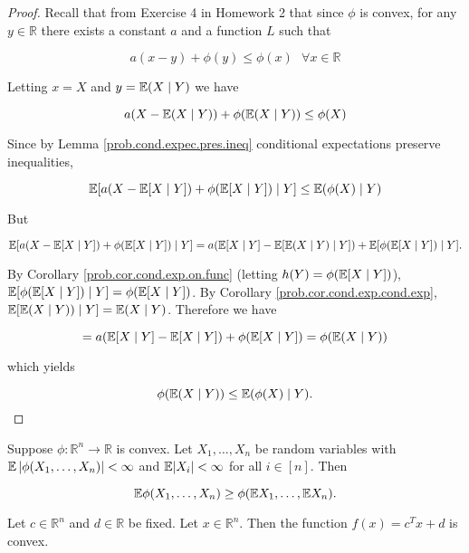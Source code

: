 \begin{proof} 


Recall that from Exercise 4 in Homework 2 that since \(\phi\) is convex, for any \(y \in \mathbb{R}\) there exists a constant \(a\) and a function \(L\) such that

\[
a(x-y)+\phi(y) \leq \phi(x) \ \ \ \forall x \in \mathbb{R}
\]

Letting \(x = X\) and \(y = \mathbb{E}(X \mid Y)\) we have

\[
a (X-\mathbb{E} (X \mid Y))+\phi(\mathbb{E} ( X \mid Y)) \leq \phi(X)
\]


Since by Lemma \ref{prob.cond.expec.pres.ineq} conditional expectations preserve inequalities,

\[
\mathbb{E}[a (X-\mathbb{E} [X \mid Y])+\phi(\mathbb{E} [X \mid Y]) \mid Y ] \leq \mathbb{E} ( \phi(X) \mid Y)
\]

But

\[
\mathbb{E}[a (X-\mathbb{E} [X \mid Y])+\phi(\mathbb{E} [X \mid Y]) \mid Y ]  = a(\mathbb{E} [X \mid Y] -  \mathbb{E}[ \mathbb{E} (X \mid Y) \mid Y] ) + \mathbb{E}[\phi(\mathbb{E} [X \mid Y]) \mid Y].
\]

By Corollary \ref{prob.cor.cond.exp.on.func} (letting \(h(Y) = \phi(\mathbb{E} [X \mid Y])\)), \( \mathbb{E}[\phi(\mathbb{E} [X \mid Y]) \mid Y] = \phi(\mathbb{E} [X \mid Y])\). By Corollary \ref{prob.cor.cond.exp.cond.exp}, \( \mathbb{E}[ \mathbb{E} (X \mid Y)) \mid Y] = \mathbb{E}(X \mid Y)\). Therefore we have

\[
 = a(\mathbb{E} [X \mid Y] - \mathbb{E} [X \mid Y]) + \phi(\mathbb{E} [X \mid Y]) = \phi(\mathbb{E} (X \mid Y))
\]

which yields

\[
\phi( \mathbb{E} (X \mid Y)) \leq \mathbb{E}( \phi(X) \mid Y).
\]


\end{proof}

\begin{theorem}\label{cvx.multi.jensen}

Suppose \(\phi: \mathbb{R}^n \to \mathbb{R}\) is convex. Let \(X_1, \ldots, X_n\) be random variables with \(\mathbb{E}\left| \phi(X_1, \ldots, X_n)\right| < \infty\) and \(\mathbb{E}|X_i| < \infty\) for all \(i \in [n]\). Then

\[
\mathbb{E} \phi(X_1, \ldots, X_n) \geq \phi(\mathbb{E} X_1, \ldots, \mathbb{E} X_n).
\]

\end{theorem}





\begin{proposition}\label{cvx.affine.cvx}

Let $c \in \mathbb{R}^n$ and \(d \in \mathbb{R}\) be fixed. Let \(x \in \mathbb{R}^n\). Then the function \( f(x) = c^Tx + d\) is convex.

\end{proposition}

